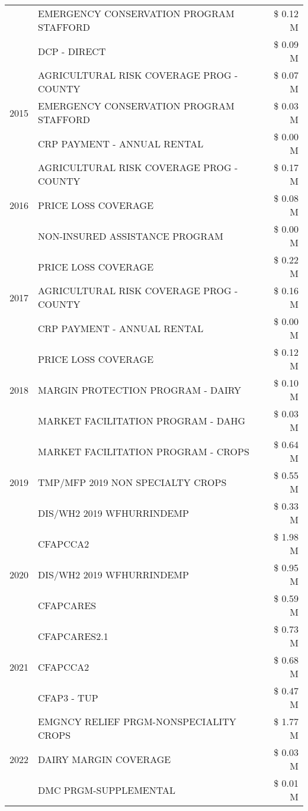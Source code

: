 \begin{tabular}{llr}
 & EMERGENCY CONSERVATION PROGRAM STAFFORD & \$ 0.12 M \\
 & DCP - DIRECT & \$ 0.09 M \\
\cline{1-3}
\multirow[t]{3}{*}{2015} & AGRICULTURAL RISK COVERAGE PROG - COUNTY & \$ 0.07 M \\
 & EMERGENCY CONSERVATION PROGRAM STAFFORD & \$ 0.03 M \\
 & CRP PAYMENT - ANNUAL RENTAL & \$ 0.00 M \\
\cline{1-3}
\multirow[t]{3}{*}{2016} & AGRICULTURAL RISK COVERAGE PROG - COUNTY & \$ 0.17 M \\
 & PRICE LOSS COVERAGE & \$ 0.08 M \\
 & NON-INSURED ASSISTANCE PROGRAM & \$ 0.00 M \\
\cline{1-3}
\multirow[t]{3}{*}{2017} & PRICE LOSS COVERAGE & \$ 0.22 M \\
 & AGRICULTURAL RISK COVERAGE PROG - COUNTY & \$ 0.16 M \\
 & CRP PAYMENT - ANNUAL RENTAL & \$ 0.00 M \\
\cline{1-3}
\multirow[t]{3}{*}{2018} & PRICE LOSS COVERAGE & \$ 0.12 M \\
 & MARGIN PROTECTION PROGRAM - DAIRY & \$ 0.10 M \\
 & MARKET FACILITATION PROGRAM - DAHG & \$ 0.03 M \\
\cline{1-3}
\multirow[t]{3}{*}{2019} & MARKET FACILITATION PROGRAM - CROPS & \$ 0.64 M \\
 & TMP/MFP 2019 NON SPECIALTY CROPS & \$ 0.55 M \\
 & DIS/WH2 2019 WFHURRINDEMP & \$ 0.33 M \\
\cline{1-3}
\multirow[t]{3}{*}{2020} & CFAPCCA2 & \$ 1.98 M \\
 & DIS/WH2 2019 WFHURRINDEMP & \$ 0.95 M \\
 & CFAPCARES & \$ 0.59 M \\
\cline{1-3}
\multirow[t]{3}{*}{2021} & CFAPCARES2.1 & \$ 0.73 M \\
 & CFAPCCA2 & \$ 0.68 M \\
 & CFAP3 - TUP & \$ 0.47 M \\
\cline{1-3}
\multirow[t]{3}{*}{2022} & EMGNCY RELIEF PRGM-NONSPECIALITY CROPS & \$ 1.77 M \\
 & DAIRY MARGIN COVERAGE & \$ 0.03 M \\
 & DMC PRGM-SUPPLEMENTAL & \$ 0.01 M \\
\cline{1-3}
\bottomrule
\end{tabular}
